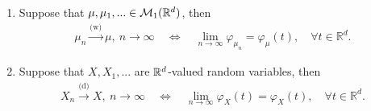 		\begin{lsuperwichtigersatz}
			\begin{theorem}\label{levy_special}
				\begin{enumerate}[label=(\roman*)]
					\item Suppose that $\mu,\mu_1,...\in \mathcal{M}_1(\mathbb{R}^d)$, then
					\begin{align*}
						\mu_n \overset{\text{(w)}}{\longrightarrow} \mu,\: n \to \infty \quad\Leftrightarrow \quad \lim_{n\to\infty} \varphi_{\mu_n} = \varphi_\mu(t), \quad \forall t \in \mathbb{R}^d.
					\end{align*}
					\item Suppose that $X,X_1,...$ are $\mathbb{R}^d$-valued random variables, then
						\begin{align*}
						X_n \overset{\text{(d)}}{\longrightarrow} X, \: n \to \infty \quad \Leftrightarrow \quad \lim_{n\to\infty}\varphi_X(t) = \varphi_X(t), \quad \forall t \in \mathbb{R}^d.
					\end{align*}				
				\end{enumerate}
			\end{theorem}
		\end{lsuperwichtigersatz}
